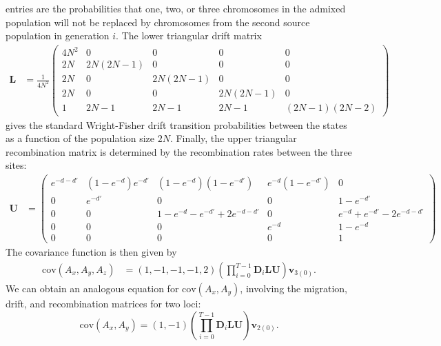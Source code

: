\begin{table}
\begin{table}
entries are the probabilities that one, two, or three chromosomes in the admixed
population will not be replaced by chromosomes from the second source population
in generation $i$. The lower triangular drift matrix \begin{align*}
\mathbf{L}&=\frac{1}{4N^2}\left( \begin{array}{ccccc} 4N^2 		& 0 	& 0 & 0 & 0\\
2N 	& 2N(2N-1) & 0 & 0 & 0\\ 2N 	& 0 & 2N(2N-1) & 0 & 0\\ 2N 	& 0 & 0 & 2N(2N-1) &
0\\ 1 & 2N-1 & 2N-1 & 2N-1 & (2N-1)(2N-2) \end{array} \right) \end{align*} gives
the standard Wright-Fisher drift transition probabilities between the states as
a function of the population size $2N$. Finally, the upper triangular
recombination matrix is determined by the recombination rates between the three
sites: \begin{align*} \mathbf{U} &= \left( \begin{array}{ccccc} e^{-d-d'} &
(1-e^{-d})e^{-d'} & (1-e^{-d})(1-e^{-d'}) & e^{-d}(1-e^{-d'}) & 0 \\ 0 & e^{-d'} &
0 & 0 & 1-e^{-d'} \\ 0 & 0 & 1-e^{-d}-e^{-d'}+2e^{-d-d'} & 0 &
e^{-d}+e^{-d'}-2e^{-d-d'} \\ 0 & 0 & 0 & e^{-d} & 1-e^{-d} \\ 0 & 0 & 0 & 0 & 1
\end{array} \right) \end{align*} The covariance function is then given by
\begin{align} \text{cov}(A_x,A_y,A_z) &=
\left(1,-1,-1,-1,2\right)\left(\prod_{i=0}^{T-1} \textbf{D}_i
\mathbf{L}\mathbf{U}\right)\textbf{v}_{3(0)}. \label{cov} \end{align} We can
obtain an analogous equation for $\text{cov}(A_x,A_y)$, involving the migration,
drift, and recombination matrices for two loci: $$ \text{cov}(A_x,A_y) =
\left(1,-1\right)\left(\prod_{i=0}^{T-1} \textbf{D}_i
\mathbf{L}\mathbf{U}\right)\textbf{v}_{2(0)}. $$


\end{table}
\end{table}
